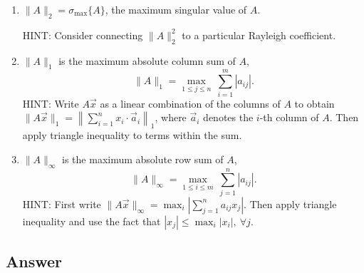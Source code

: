 \documentclass[
  12pt,
]{fphw}
\begin{document}
\begin{enumerate}
\item[(a)] $\|A\|_2 = \sigma_{\max}\{A\}$, the maximum singular value of $A$.

HINT: Consider connecting $\|A\|_2^2$ to a particular Rayleigh coefficient.

\item[(b)] $\|A\|_1$ is the maximum absolute column sum of $A$,
\[
\|A\|_1 = \max_{1\le j\le n}\ \sum_{i=1}^m |a_{ij}|. \tag{18}
\]
HINT: Write $A\vec x$ as a linear combination of the columns of $A$ to obtain $\|A\vec x\|_1 = \left\|\sum_{i=1}^n x_i\cdot \vec a_i\right\|_1$,
where $\vec a_i$ denotes the $i$-th column of $A$. Then apply triangle inequality to terms within the sum.

\item[(c)] $\|A\|_\infty$ is the maximum absolute row sum of $A$,
\[
\|A\|_\infty = \max_{1\le i\le m}\ \sum_{j=1}^n |a_{ij}|. \tag{19}
\]
HINT: First write $\|A\vec x\|_\infty = \max_i \left|\sum_{j=1}^n a_{ij}x_j\right|$. Then apply triangle inequality and use the fact that
$|x_j| \le \max_i |x_i|,\ \forall j$.
\end{enumerate}


\subsection*{Answer}
\end{document}
